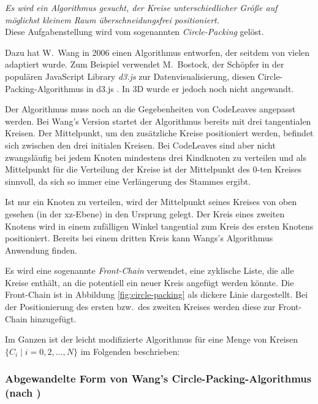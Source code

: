 \textit{Es wird ein Algorithmus gesucht, der Kreise unterschiedlicher Größe auf möglichst kleinem Raum überschneidungsfrei positioniert.}\\

Diese Aufgabenstellung wird vom sogenannten \textit{Circle-Packing} gelöst.

Dazu hat W.\ Wang in \cite{wang2006visualization} 2006 einen Algorithmus entworfen, der seitdem von vielen adaptiert wurde. Zum Beispiel verwendet M.\ Bostock, der Schöpfer in der populären JavaScript Library \textit{d3.js} zur Datenvisualisierung, diesen Circle-Packing-Algorithmus in d3.js \cite{bostock2017abetter}. In 3D wurde er jedoch noch nicht angewandt.

Der Algorithmus muss noch an die Gegebenheiten von CodeLeaves angepasst werden. Bei Wang's Version startet der Algorithmus bereits mit drei tangentialen Kreisen. Der Mittelpunkt, um den zusätzliche Kreise positioniert werden, befindet sich zwischen den drei initialen Kreisen. Bei CodeLeaves sind aber nicht zwangsläufig bei jedem Knoten mindestens drei Kindknoten zu verteilen und als Mittelpunkt für die Verteilung der Kreise ist der Mittelpunkt des $0$-ten Kreises sinnvoll, da sich so immer eine Verlängerung des Stammes ergibt.

Ist nur ein Knoten zu verteilen, wird der Mittelpunkt seines Kreises von oben gesehen (in der xz-Ebene) in den Ursprung gelegt. Der Kreis eines zweiten Knotens wird in einem zufälligen Winkel tangential zum Kreis des ersten Knotens positioniert. Bereits bei einem dritten Kreis kann Wangs's Algorithmus Anwendung finden.

Es wird eine sogenannte \textit{Front-Chain} verwendet, eine zyklische Liste, die alle Kreise enthält, an die potentiell ein neuer Kreis angefügt werden könnte. Die Front-Chain ist in Abbildung \ref{fig:circle-packing} als dickere Linie dargestellt. Bei der Positionierung des ersten bzw.\ des zweiten Kreises werden diese zur Front-Chain hinzugefügt.

Im Ganzen ist der leicht modifizierte Algorithmus für eine Menge von Kreisen $\lbrace C_i \mid i = 0, 2, \dots , N \rbrace$ im Folgenden beschrieben:

\subsubsection*{Abgewandelte Form von Wang's Circle-Packing-Algorithmus (nach \cite{wang2006visualization})}

